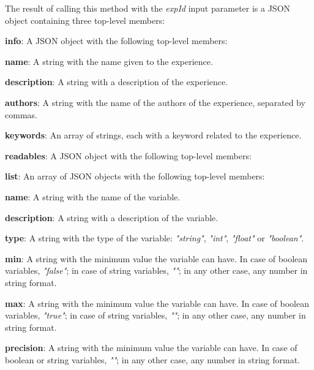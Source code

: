 The result of calling this method with the \textit{expId} input parameter is a JSON object containing three top-level members:

\begin{myEnumerate}
    \item \textbf{info}: A JSON object with the following top-level members:
    \begin{myEnumerate}
        \item \textbf{name}: A string with the name given to the experience.
        \item \textbf{description}: A string with a description of the experience.
        \item \textbf{authors}: A string with the name of the authors of the experience, separated by commas.
        \item \textbf{keywords}: An array of strings, each with a keyword related to the experience.
    \end{myEnumerate}
    \item \textbf{readables}: A JSON object with the following top-level members:
    \begin{myEnumerate}
        \item \textbf{list}: An array of JSON objects with the following top-level members:
        \begin{myEnumerate}
            \item \textbf{name}: A string with the name of the variable.
            \item \textbf{description}: A string with a description of the variable.
            \item \textbf{type}: A string with the type of the variable: \textit{"string"}, \textit{"int"}, \textit{"float"} or \textit{"boolean"}.
            \item \textbf{min}: A string with the minimum value the variable can have. In case of boolean variables, \textit{"false"}; in case of string variables, \textit{""}; in any other case, any number in string format.
            \item \textbf{max}: A string with the minimum value the variable can have. In case of boolean variables, \textit{"true"}; in case of string variables, \textit{""}; in any other case, any number in string format.
            \item \textbf{precision}: A string with the minimum value the variable can have. In case of boolean or string variables, \textit{""}; in any other case, any number in string format.
        \end{myEnumerate}

\end{myEnumerate}
\end{myEnumerate}
